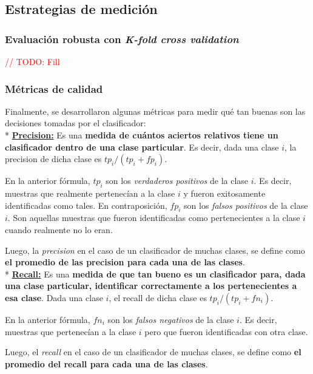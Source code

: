 \subsection{Estrategias de medici\'on}

\subsubsection{Evaluaci\'on robusta con \textit{K-fold cross validation}}

\textcolor{red}{// TODO: Fill}

\subsubsection{M\'etricas de calidad}

Finalmente, se desarrollaron algunas m\'etricas para medir qu\'e tan buenas son las decisiones tomadas por el clasificador: \\

* \underline{\textbf{Precision:}} Es una \textbf{medida de cu\'antos aciertos relativos tiene un clasificador dentro de una clase particular}. Es decir, dada una clase $i$, la precision de dicha clase es $tp_{i} / (tp_{i} + fp_{i})$.

En la anterior f\'ormula, $tp_{i}$ son los \textit{verdaderos positivos} de la clase $i$. Es decir, muestras que realmente pertenec\'ian a la clase $i$ y fueron exitosamente identificadas como tales. En contraposici\'on, $fp_{i}$ son los \textit{falsos positivos} de la clase $i$. Son aquellas muestras que fueron identificadas como pertenecientes a la clase $i$ cuando realmente no lo eran.

Luego, la \textit{precision} en el caso de un clasificador de muchas clases, se define como \textbf{el promedio de las precision para cada una de las clases}. \\

* \underline{\textbf{Recall:}} Es una \textbf{medida de que tan bueno es un clasificador para, dada una clase particular, identificar correctamente a los pertenecientes a esa clase}. Dada una clase $i$, el recall de dicha clase es $tp_{i} / (tp_{i} + fn_{i})$.

En la anterior f\'ormula, $fn_{i}$ son los \textit{falsos negativos} de la clase $i$. Es decir, muestras que pertenec\'ian a la clase $i$ pero que fueron identificadas con otra clase.

Luego, el \textit{recall} en el caso de un clasificador de muchas clases, se define como \textbf{el promedio del recall para cada una de las clases}. \\

